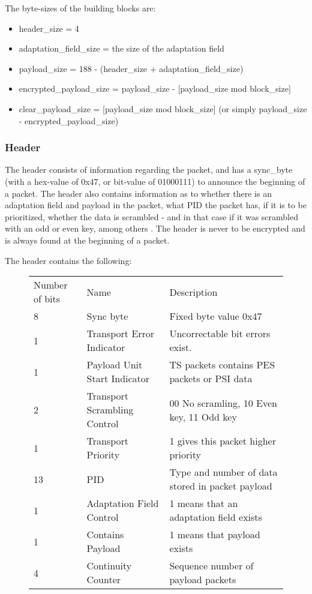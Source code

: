 The byte-sizes of the building blocks are:

\begin{itemize}
\item header\_size = 4
\item adaptation\_field\_size = the size of the adaptation field
\item payload\_size = 188 - (header\_size + adaptation\_field\_size)
\item encrypted\_payload\_size = payload\_size - [payload\_size mod block\_size]
\item clear\_payload\_size = [payload\_size mod block\_size] 
  (or simply payload\_size - encrypted\_payload\_size)
\end{itemize}

\subsubsection{Header}
The header consists of information regarding the packet, and has a sync\_byte 
(with a hex-value of 0x47, or bit-value of 01000111) to announce the beginning 
of a packet. The header also contains information as to whether there is an 
adaptation field and payload in the packet, what PID the packet has, if it is to 
be prioritized, whether the data is scrambled - and in that case if it was 
scrambled with an odd or even key, among others \citep[pp. 25--26]{etsiMPEG:2009}
. The header is never to be encrypted and is always found at the beginning of a 
packet. \citep[pp. 10--11]{DVB:2013}

The header contains the following:
\begin{small}
\begin{figure}[h!]
  \begin{longtable}{l l l}
    Number of bits & Name & Description \\
    8 & Sync byte & Fixed byte value 0x47 \\
    1 & Transport Error Indicator & Uncorrectable bit errors exist. \\
    1 & Payload Unit Start Indicator & TS packets contains PES packets or PSI 
    data\\
    2 & Transport Scrambling Control & 00 No scramling, 10 Even key, 11 Odd key \\
    1 & Transport Priority & 1 gives this packet higher priority \\
    13 & PID & Type and number of data stored in packet payload \\
    1 & Adaptation Field Control & 1 means that an adaptation field exists\\
    1 & Contains Payload & 1 means that payload exists \\
    4 & Continuity Counter & Sequence number of payload packets\\
  \end{longtable}
\end{figure}
\end{small}

